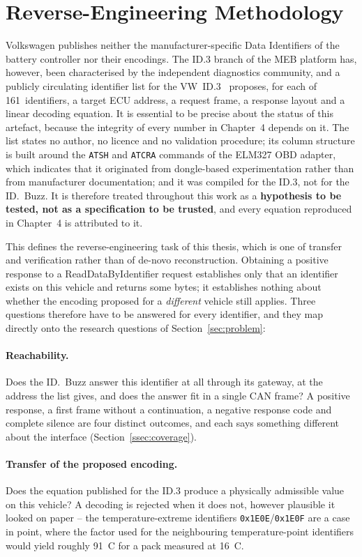\documentclass[11pt,a4paper,oneside,parskip=half]{scrreprt}
\providecommand{\hex}{}\renewcommand{\hex}[1]{\texttt{0x#1}}
\begin{document}
\section{Reverse-Engineering Methodology}
\label{sec:re_methodology}
Volkswagen publishes neither the manufacturer-specific Data Identifiers of the battery controller nor their encodings. The ID.3 branch of the MEB platform has, however, been characterised by the independent diagnostics community, and a publicly circulating identifier list for the VW~ID.3~\cite{vwmebpidlist} proposes, for each of 161~identifiers, a target ECU address, a request frame, a response layout and a linear decoding equation. It is essential to be precise about the status of this artefact, because the integrity of every number in Chapter~4 depends on it. The list states no author, no licence and no validation procedure; its column structure is built around the \texttt{ATSH} and \texttt{ATCRA} commands of the ELM327 OBD adapter, which indicates that it originated from dongle-based experimentation rather than from manufacturer documentation; and it was compiled for the ID.3, not for the ID.~Buzz. It is therefore treated throughout this work as a \textbf{hypothesis to be tested, not as a specification to be trusted}, and every equation reproduced in Chapter~4 is attributed to it.

This defines the reverse-engineering task of this thesis, which is one of transfer and verification rather than of de-novo reconstruction. Obtaining a positive response to a ReadDataByIdentifier request establishes only that an identifier exists on this vehicle and returns some bytes; it establishes nothing about whether the encoding proposed for a \emph{different} vehicle still applies. Three questions therefore have to be answered for every identifier, and they map directly onto the research questions of Section~\ref{sec:problem}:

\paragraph{Reachability.} Does the ID.~Buzz answer this identifier at all through its gateway, at the address the list gives, and does the answer fit in a single CAN frame? A positive response, a first frame without a continuation, a negative response code and complete silence are four distinct outcomes, and each says something different about the interface (Section~\ref{ssec:coverage}).

\paragraph{Transfer of the proposed encoding.} Does the equation published for the ID.3 produce a physically admissible value on this vehicle? A decoding is rejected when it does not, however plausible it looked on paper -- the temperature-extreme identifiers \hex{1E0E}/\hex{1E0F} are a case in point, where the factor used for the neighbouring temperature-point identifiers would yield roughly 91~\textdegree C for a pack measured at 16~\textdegree C.
\end{document}
